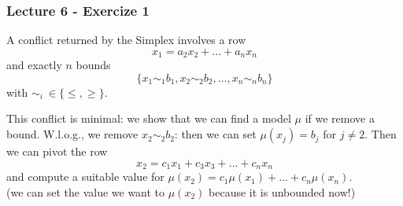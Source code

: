 \begin{frame}
  \frametitle{Lecture 6 - Exercize 1}

  A conflict returned by the Simplex involves a row
  $$
  x_1 = a_2 x_2 + \ldots + a_n x_n 
  $$
  and exactly $n$ bounds
  $$
  \{ x_1 \sim_1 b_1, x_2 \sim_2 b_2, \ldots, x_n \sim_n b_n \} 
  $$
  with $\sim_i\ \in \{ \leq, \geq \}$.

  This conflict is minimal: we show that we can find a model $\mu$ if we remove a bound.
  W.l.o.g., we remove $x_2 \sim_2 b_2$: then we can set $\mu(x_j) = b_j$ for $j\not=2$.
  Then we can pivot the row
  $$
  x_2 = c_1 x_1 + c_3 x_3 + \ldots + c_n x_n 
  $$
  and compute a suitable value for $\mu(x_2) = c_1 \mu(x_1) + \ldots + c_n \mu(x_n)$.\\
  (we can set the value we want to $\mu(x_2)$ because it is unbounded now!)

\end{frame}
